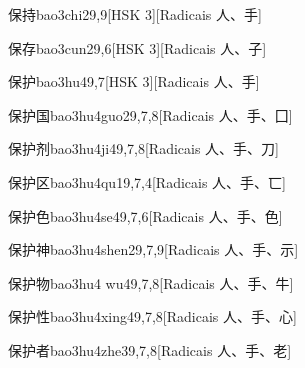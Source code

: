 \begin{entry}{保持}{bao3chi2}{9,9}[HSK 3][Radicais ⼈、⼿]
\end{entry}

\begin{entry}{保存}{bao3cun2}{9,6}[HSK 3][Radicais ⼈、⼦]
\end{entry}

\begin{entry}{保护}{bao3hu4}{9,7}[HSK 3][Radicais ⼈、⼿]
\end{entry}

\begin{entry}{保护国}{bao3hu4guo2}{9,7,8}[Radicais ⼈、⼿、⼞]
\end{entry}

\begin{entry}{保护剂}{bao3hu4ji4}{9,7,8}[Radicais ⼈、⼿、⼑]
\end{entry}

\begin{entry}{保护区}{bao3hu4qu1}{9,7,4}[Radicais ⼈、⼿、⼖]
\end{entry}

\begin{entry}{保护色}{bao3hu4se4}{9,7,6}[Radicais ⼈、⼿、⾊]
\end{entry}

\begin{entry}{保护神}{bao3hu4shen2}{9,7,9}[Radicais ⼈、⼿、⽰]
\end{entry}

\begin{entry}{保护物}{bao3hu4 wu4}{9,7,8}[Radicais ⼈、⼿、⽜]
\end{entry}

\begin{entry}{保护性}{bao3hu4xing4}{9,7,8}[Radicais ⼈、⼿、⼼]
\end{entry}

\begin{entry}{保护者}{bao3hu4zhe3}{9,7,8}[Radicais ⼈、⼿、⽼]
\end{entry}

